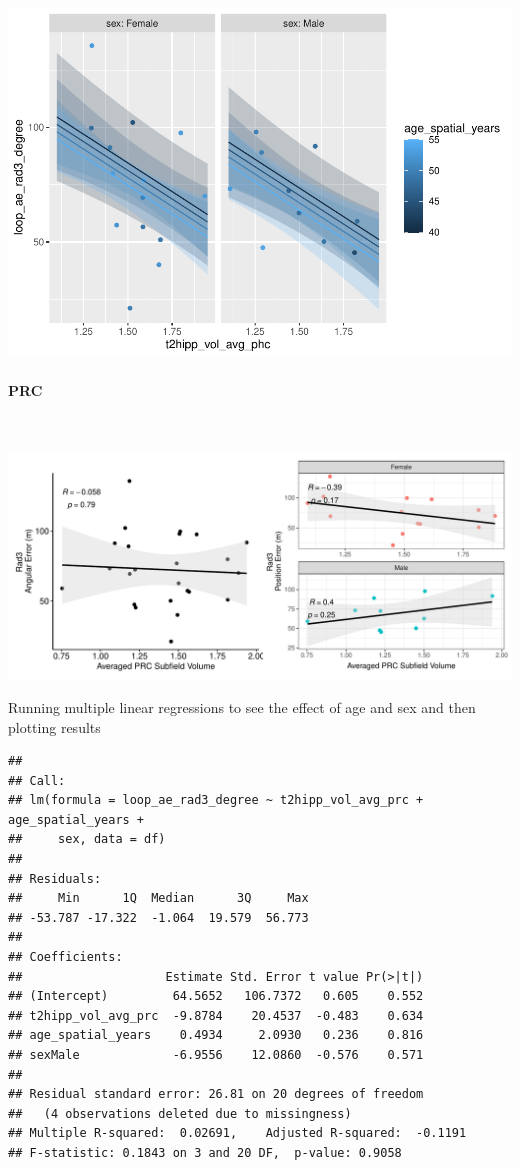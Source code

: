 \documentclass[
]{article}
\begin{document}
\includegraphics{hippocampal_subfield_files/figure-latex/Avg PHC + rad3 angular errorMLR-1.pdf}
\vspace{1cm}

\newpage
\paragraph{PRC}

~ \vspace{1cm}

\includegraphics{hippocampal_subfield_files/figure-latex/unnamed-chunk-12-1.pdf}

\vspace{1cm}

Running multiple linear regressions to see the effect of age and sex and
then plotting results

\begin{verbatim}
## 
## Call:
## lm(formula = loop_ae_rad3_degree ~ t2hipp_vol_avg_prc + age_spatial_years + 
##     sex, data = df)
## 
## Residuals:
##     Min      1Q  Median      3Q     Max 
## -53.787 -17.322  -1.064  19.579  56.773 
## 
## Coefficients:
##                    Estimate Std. Error t value Pr(>|t|)
## (Intercept)         64.5652   106.7372   0.605    0.552
## t2hipp_vol_avg_prc  -9.8784    20.4537  -0.483    0.634
## age_spatial_years    0.4934     2.0930   0.236    0.816
## sexMale             -6.9556    12.0860  -0.576    0.571
## 
## Residual standard error: 26.81 on 20 degrees of freedom
##   (4 observations deleted due to missingness)
## Multiple R-squared:  0.02691,    Adjusted R-squared:  -0.1191 
## F-statistic: 0.1843 on 3 and 20 DF,  p-value: 0.9058
\end{verbatim}
\end{document}
